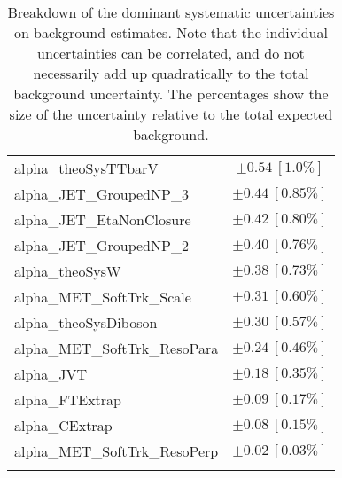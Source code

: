 \begin{table}
\begin{center}
\begin{tabular*}{\textwidth}{@{\extracolsep{\fill}}lc}
alpha\_theoSysTTbarV         & $\pm 0.54\ [1.0\%] $       \\
alpha\_JET\_GroupedNP\_3         & $\pm 0.44\ [0.85\%] $       \\
alpha\_JET\_EtaNonClosure         & $\pm 0.42\ [0.80\%] $       \\
alpha\_JET\_GroupedNP\_2         & $\pm 0.40\ [0.76\%] $       \\
alpha\_theoSysW         & $\pm 0.38\ [0.73\%] $       \\
alpha\_MET\_SoftTrk\_Scale         & $\pm 0.31\ [0.60\%] $       \\
alpha\_theoSysDiboson         & $\pm 0.30\ [0.57\%] $       \\
alpha\_MET\_SoftTrk\_ResoPara         & $\pm 0.24\ [0.46\%] $       \\
alpha\_JVT         & $\pm 0.18\ [0.35\%] $       \\
alpha\_FTExtrap         & $\pm 0.09\ [0.17\%] $       \\
alpha\_CExtrap         & $\pm 0.08\ [0.15\%] $       \\
alpha\_MET\_SoftTrk\_ResoPerp         & $\pm 0.02\ [0.03\%] $       \\
\noalign{\smallskip}\hline\noalign{\smallskip}
\end{tabular*}
\end{center}
\caption[Breakdown of uncertainty on background estimates]{
Breakdown of the dominant systematic uncertainties on background estimates.
Note that the individual uncertainties can be correlated, and do not necessarily add up quadratically to 
the total background uncertainty. The percentages show the size of the uncertainty relative to the total expected background.
\label{table.results.bkgestimate.uncertainties.SRB_TW}}
\end{table}
%